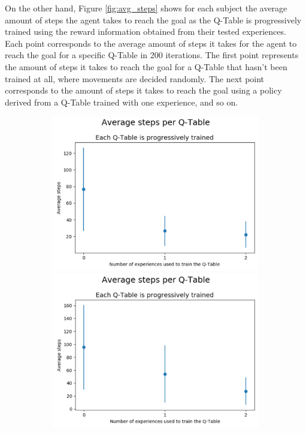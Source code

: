 \documentclass[journal]{IEEEtran}
\begin{document}
{{On the other hand, Figure \ref{fig:avg_steps} shows for each subject the average amount of steps the agent takes to reach the goal as the Q-Table is progressively trained using the reward information obtained from their tested experiences. Each point corresponds to the average amount of steps it takes for the agent to reach the goal for a specific Q-Table in 200 iterations. The first point represents the amount of steps it takes to reach the goal for a Q-Table that hasn't been trained at all, where movements are decided randomly. The next point corresponds to the amount of steps it takes to reach the goal using a policy derived from a Q-Table trained with one experience, and so on.

\begin{figure}[h!]
\begin{subfigure}{0.5\textwidth}
\includegraphics[scale=0.2]{Images/Average_steps/alex.png}
\includegraphics[scale=0.2]{Images/Average_steps/gonza.png}

\end{subfigure}
\end{figure}}}
\end{document}
